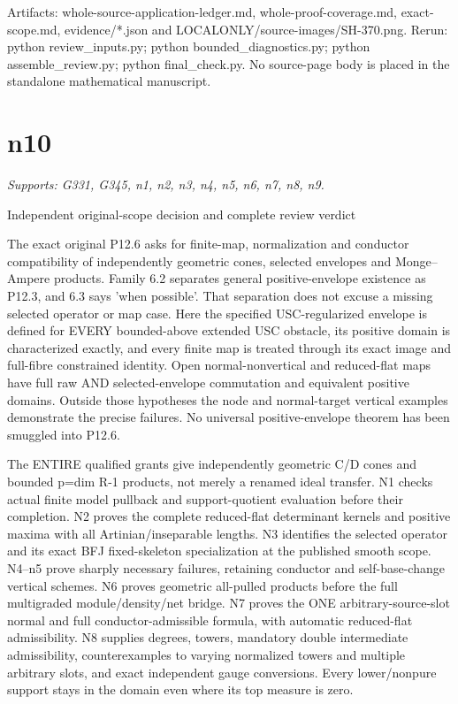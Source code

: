 \documentclass[11pt]{article}
\begin{document}
\begin{ReviewBody}
Artifacts: whole-source-application-ledger.md, whole-proof-coverage.md, exact-scope.md, evidence/*.json and LOCALONLY/source-images/SH-370.png. Rerun: python review_inputs.py; python bounded_diagnostics.py; python assemble_review.py; python final_check.py. No source-page body is placed in the standalone mathematical manuscript.
\end{ReviewBody}

\section{n10}
\textit{Supports: G331, G345, n1, n2, n3, n4, n5, n6, n7, n8, n9.}
\begin{ReviewBody}
Independent original-scope decision and complete review verdict

The exact original P12.6 asks for finite-map, normalization and conductor compatibility of independently geometric cones, selected envelopes and Monge--Ampere products. Family 6.2 separates general positive-envelope existence as P12.3, and 6.3 says 'when possible'. That separation does not excuse a missing selected operator or map case. Here the specified USC-regularized envelope is defined for EVERY bounded-above extended USC obstacle, its positive domain is characterized exactly, and every finite map is treated through its exact image and full-fibre constrained identity. Open normal-nonvertical and reduced-flat maps have full raw AND selected-envelope commutation and equivalent positive domains. Outside those hypotheses the node and normal-target vertical examples demonstrate the precise failures. No universal positive-envelope theorem has been smuggled into P12.6.

The ENTIRE qualified grants give independently geometric C/D cones and bounded p=dim R-1 products, not merely a renamed ideal transfer. N1 checks actual finite model pullback and support-quotient evaluation before their completion. N2 proves the complete reduced-flat determinant kernels and positive maxima with all Artinian/inseparable lengths. N3 identifies the selected operator and its exact BFJ fixed-skeleton specialization at the published smooth scope. N4--n5 prove sharply necessary failures, retaining conductor and self-base-change vertical schemes. N6 proves geometric all-pulled products before the full multigraded module/density/net bridge. N7 proves the ONE arbitrary-source-slot normal and full conductor-admissible formula, with automatic reduced-flat admissibility. N8 supplies degrees, towers, mandatory double intermediate admissibility, counterexamples to varying normalized towers and multiple arbitrary slots, and exact independent gauge conversions. Every lower/nonpure support stays in the domain even where its top measure is zero.


\end{ReviewBody}
\end{document}
